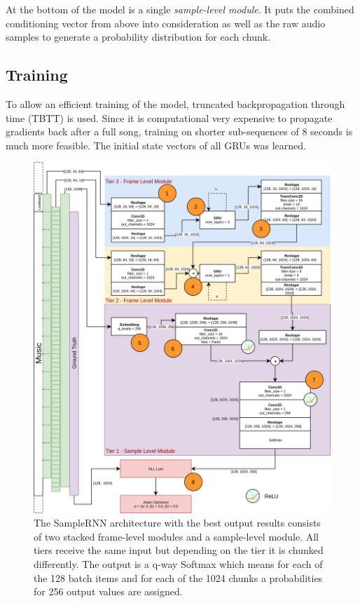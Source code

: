 \documentclass[12pt]{article}
\begin{document}
At the bottom of the model is a single \emph{sample-level module}.
It puts the combined conditioning vector from above into consideration as well as the raw audio samples to generate a probability distribution for each chunk.




\subsection{Training}
To allow an efficient training of the model, truncated backpropagation through time (TBTT) is used.
Since it is computational very expensive to propagate gradients back after a full song, training on shorter sub-sequences of 8 seconds is much more feasible.
The initial state vectors of all GRUs was learned.

\begin{figure}
    \includegraphics[width=\textwidth]{img/samplernn-arch.png}
    \caption{The SampleRNN architecture with the best output results consists of two stacked frame-level modules and a sample-level module. All tiers receive the same input but depending on the tier it is chunked differently. The output is a q-way Softmax which means for each of the 128 batch items and for each of the 1024 chunks a probabilities for 256 output values are assigned.}
    \label{fig:samplernn-arch}
\end{figure}
\end{document}
